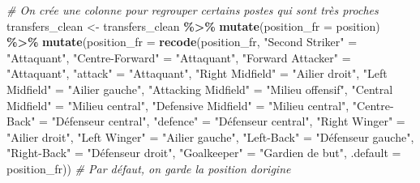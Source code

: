 \documentclass[
]{article}
\newenvironment{Shaded}{\begin{snugshade}}{\end{snugshade}}
\newcommand{\AttributeTok}[1]{\textcolor[rgb]{0.13,0.29,0.53}{#1}}
\newcommand{\CommentTok}[1]{\textcolor[rgb]{0.56,0.35,0.01}{\textit{#1}}}
\newcommand{\FunctionTok}[1]{\textcolor[rgb]{0.13,0.29,0.53}{\textbf{#1}}}
\newcommand{\NormalTok}[1]{#1}
\newcommand{\OtherTok}[1]{\textcolor[rgb]{0.56,0.35,0.01}{#1}}
\newcommand{\SpecialCharTok}[1]{\textcolor[rgb]{0.81,0.36,0.00}{\textbf{#1}}}
\newcommand{\StringTok}[1]{\textcolor[rgb]{0.31,0.60,0.02}{#1}}
\begin{document}
\begin{Shaded}
\begin{Highlighting}[]
\CommentTok{\# On crée une colonne pour regrouper certains postes qui sont très proches}
\NormalTok{transfers\_clean }\OtherTok{\textless{}{-}}\NormalTok{ transfers\_clean }\SpecialCharTok{\%\textgreater{}\%}
  \FunctionTok{mutate}\NormalTok{(}\AttributeTok{position\_fr =}\NormalTok{ position) }\SpecialCharTok{\%\textgreater{}\%}
  \FunctionTok{mutate}\NormalTok{(}\AttributeTok{position\_fr =} \FunctionTok{recode}\NormalTok{(position\_fr,}
                              \StringTok{"Second Striker"} \OtherTok{=} \StringTok{"Attaquant"}\NormalTok{,}
                              \StringTok{"Centre{-}Forward"} \OtherTok{=} \StringTok{"Attaquant"}\NormalTok{,}
                              \StringTok{"Forward Attacker"} \OtherTok{=} \StringTok{"Attaquant"}\NormalTok{,}
                              \StringTok{"attack"} \OtherTok{=} \StringTok{"Attaquant"}\NormalTok{,}
                              \StringTok{"Right Midfield"} \OtherTok{=} \StringTok{"Ailier droit"}\NormalTok{,}
                              \StringTok{"Left Midfield"} \OtherTok{=} \StringTok{"Ailier gauche"}\NormalTok{,}
                              \StringTok{"Attacking Midfield"} \OtherTok{=} \StringTok{"Milieu offensif"}\NormalTok{,}
                              \StringTok{"Central Midfield"} \OtherTok{=} \StringTok{"Milieu central"}\NormalTok{,}
                              \StringTok{"Defensive Midfield"} \OtherTok{=} \StringTok{"Milieu central"}\NormalTok{, }
                              \StringTok{"Centre{-}Back"} \OtherTok{=} \StringTok{"Défenseur central"}\NormalTok{,}
                              \StringTok{"defence"} \OtherTok{=} \StringTok{"Défenseur central"}\NormalTok{,}
                              \StringTok{"Right Winger"} \OtherTok{=} \StringTok{"Ailier droit"}\NormalTok{,}
                              \StringTok{"Left Winger"} \OtherTok{=} \StringTok{"Ailier gauche"}\NormalTok{, }
                              \StringTok{"Left{-}Back"} \OtherTok{=} \StringTok{"Défenseur gauche"}\NormalTok{,}
                              \StringTok{"Right{-}Back"} \OtherTok{=} \StringTok{"Défenseur droit"}\NormalTok{,}
                              \StringTok{"Goalkeeper"} \OtherTok{=} \StringTok{"Gardien de but"}\NormalTok{,}
                              \AttributeTok{.default =}\NormalTok{ position\_fr))  }\CommentTok{\# Par défaut, on garde la position d\textquotesingle{}origine}


\end{Highlighting}
\end{Shaded}
\end{document}
